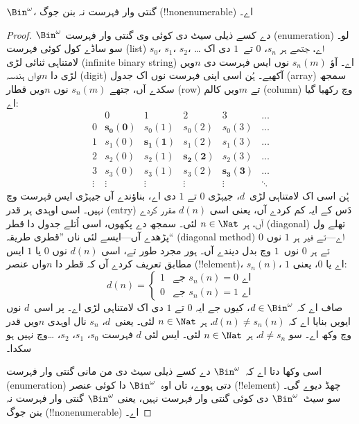 \documentclass[../../../include/open-logic-section]{subfiles}
\begin{document}
\begin{thm}
$\Bin^\omega$، گنتی وار فہرست نہ بنن جوگ (!!{nonenumerable}) اے۔
\end{thm}

\begin{proof}
$\Bin^\omega$ دے کسے ذیلی سیٹ دی کوئی وی گنتی وار فہرست
(enumeration) لو۔ سو ساڈے کول کوئی فہرست (list) $s_{0}$، $s_{1}$،
$s_{2}$، \dots{} اے، جتھے ہر $s_n$، $0$ تے~$1$ دی اک لامتناہی
ثنائی لڑی (infinite binary string) اے۔ آؤ $s_n(m)$ نوں ایس فہرست دی
$n$ویں لڑی دا $m$واں ہندسہ (digit) آکھیے۔ ہُن اسی اپنی فہرست نوں اک
جدول (array) سمجھ سکدے آں، جتھے $s_n(m)$ نوں $n$ویں قطار (row) تے
$m$ویں کالم (column) وچ رکھیا گیا اے:
\[
\begin{array}{c|c|c|c|c|c}
& 0 & 1 & 2 & 3 & \dots \\\hline
0 & \mathbf{s_{0}(0)} & s_{0}(1) & s_{0}(2) & s_0(3) & \dots \\\hline
1 & s_{1}(0)& \mathbf{s_{1}(1)} & s_1(2) & s_1(3) & \dots \\\hline
2 & s_{2}(0)& s_{2}(1) & \mathbf{s_2(2)} & s_2(3) & \dots \\\hline
3 & s_{3}(0)& s_{3}(1) & s_3(2) & \mathbf{s_3(3)} & \dots \\\hline
\vdots & \vdots & \vdots & \vdots & \vdots & \mathbf{\ddots}
\end{array}
\]
ہُن اسی اک لامتناہی لڑی~$d$، جیہڑی $0$ تے $1$ دی اے، بناؤندے آں
جیہڑی ایس فہرست وچ نہیں۔ اسی اوہدی ہر قدر (entry) دَس کے ایہ کم کردے
آں، یعنی اسی $d(n)$ مقرر کردے آں، ہر $n \in \Nat$ لئی۔ سمجھ دے
پکھوں، اسی اُتلے جدول
دا قطر (diagonal) تھلے ول پڑھدے آں---ایسے لئی ناں ”قطری طریقہ“
(diagonal method) اے---تے فیر ہر $1$ نوں $0$ تے ہر $0$ نوں~$1$ وچ
بدل دیندے آں۔
ہور مجرد طور تے، اسی $d(n)$ نوں $0$ یا $1$ ایس مطابق تعریف کردے آں
کہ قطر دا $n$واں عنصر (!!{element})، $s_n(n)$، $1$ اے یا $0$، یعنی:
\[
d(n) =
\begin{cases}
1 & \text{جے $s_{n}(n) = 0$ اے}\\
0 & \text{جے $s_{n}(n) = 1$ اے}
\end{cases}
\]
صاف اے کہ $d \in \Bin^\omega$، کیوں جے ایہ $0$ تے $1$ دی اک
لامتناہی لڑی اے۔ پر اسی~$d$ نوں ایویں بنایا اے کہ
$d(n) \neq s_n(n)$، ہر $n \in \Nat$ لئی۔ یعنی~$d$، $s_n$ نال
اوہدی $n$ویں قدر وچ وکھ اے۔ سو $d \neq s_n$، ہر $n\in \Nat$ لئی۔
ایس لئی $d$ فہرست $s_0$، $s_1$، $s_2$، \dots وچ نہیں ہو سکدا۔

اسی وکھا دتا اے کہ~$\Bin^\omega$ دے کسے ذیلی سیٹ دی من مانی گنتی
وار فہرست (enumeration) دتی ہووے، تاں اوہ~$\Bin^\omega$ دا کوئی عنصر
(!!{element}) چھڈ دیوے گی۔ سو سیٹ~$\Bin^\omega$ دی کوئی گنتی وار
فہرست نہیں، یعنی $\Bin^\omega$ گنتی وار فہرست نہ بنن جوگ
(!!{nonenumerable}) اے۔
\end{proof}
\end{document}
